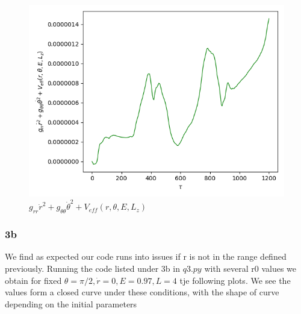 \documentclass[10pt,a4paper]{report}
\begin{document}
\begin{figure}[!ht]
\begin{minipage}[b]{0.5\linewidth}
\centering
\includegraphics[width=\textwidth]{3a/Veff.png}
\caption{$g_{rr}\dot{r}^2+g_{\theta\theta}\dot{\theta}^2 + V_{eff}(r, \theta, E, L_z)$}
\label{fig:figure1}
\end{minipage}
\end{figure}

\newpage

\subsubsection*{3b}

We find as expected our code runs into issues if r is not in the range defined previously. Running the code listed under 3b in $q3.py$ with several r0 values  we obtain for fixed $\theta=\pi/2, \dot{r}=0, E=0.97, L=4$ tje following plots. We see the values form a closed curve under these conditions, with the shape of curve depending on the initial parameters
\end{document}
